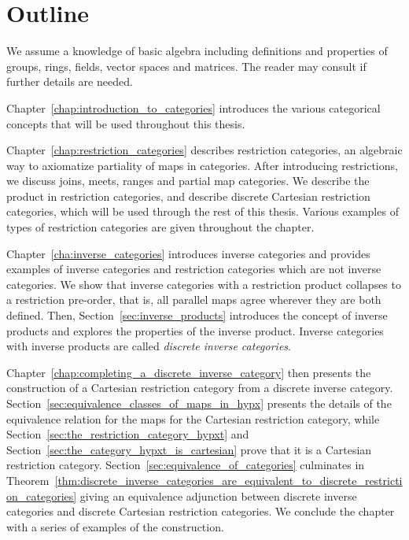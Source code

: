 \section{Outline} %
\label{sec:outline}

We assume a knowledge of basic algebra including definitions and properties of groups, rings,
fields, vector spaces and matrices. The reader may consult \cite{lang:algebra} if further details
are needed.

Chapter~\ref{chap:introduction_to_categories} introduces the various categorical concepts that will
be used throughout this thesis.

Chapter~\ref{chap:restriction_categories} describes restriction categories, an algebraic way to
axiomatize partiality of maps in categories. After introducing restrictions, we discuss joins,
meets, ranges and partial map categories. We describe the product in restriction categories, and
describe discrete Cartesian restriction categories, which will be used through the rest of this
thesis. Various examples of types of restriction categories are given throughout the chapter.


Chapter~\ref{cha:inverse_categories} introduces inverse categories and provides examples of inverse
categories and restriction categories which are not inverse categories. We show that inverse categories with a restriction
product collapses to a restriction pre-order, that is, all parallel maps agree wherever they are
both defined. Then, Section~\ref{sec:inverse_products} introduces the concept of inverse products and
explores the properties of the inverse product. Inverse categories with
inverse products are called \emph{discrete inverse categories}.

Chapter~\ref{chap:completing_a_discrete_inverse_category} then presents the construction of a
Cartesian restriction category from a discrete inverse category.
Section~\ref{sec:equivalence_classes_of_maps_in_hypx} presents the details of the equivalence
relation for the maps for the Cartesian restriction category, while
Section~\ref{sec:the_restriction_category_hypxt} and
Section~\ref{sec:the_category_hypxt_is_cartesian} prove that it is a Cartesian restriction
category. Section~\ref{sec:equivalence_of_categories} culminates in
Theorem~\ref{thm:discrete_inverse_categories_are_equivalent_to_discrete_restriction_categories}
giving an equivalence adjunction between discrete inverse categories and discrete Cartesian
restriction categories. We conclude the chapter with a series of examples of the construction.

